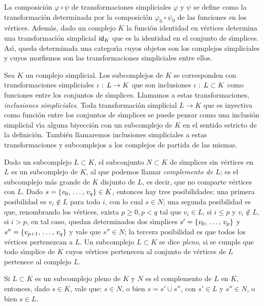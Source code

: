 La composici\'{o}n $\varphi\circ\psi$ de transformaciones simpliciales
$\varphi$ y $\psi$ se define como la transformaci\'{o}n determinada por la
composici\'{o}n $\varphi_{0}\circ\psi_{0}$ de las funciones en los
v\'{e}rtices. Adem\'{a}s, dado un complejo $K$ la funci\'{o}n identidad en
v\'{e}rtices determina una transformaci\'{o}n simplicial $\id[K]$ que es la
identidad en el conjunto de s\'{\i}mplices. As\'{\i}, queda determinada
una categor\'{\i}a cuyos objetos son los complejos simpliciales y cuyos
morfismos son las transformaciones simpliciales entre ellos.

Sea $K$ un complejo simplicial. Los subcomplejos de $K$ se corresponden con
transformaciones simpliciales $\inc:\,L\rightarrow K$ que son inclusiones
$\inc:\,L\subset K$ como funciones entre los conjuntos de s\'{\i}mplices.
Llamamos a estas transformaciones, \emph{inclusiones simpliciales}.
Toda transformaci\'{o}n simplicial $L\rightarrow K$ que es inyectiva como
funci\'{o}n entre los conjuntos de s\'{\i}mplices se puede pensar como una
inclusi\'{o}n simplicial v\'{\i}a alguna biyecci\'{o}n con un subcomplejo
de $K$ en el sentido estricto de la definici\'{o}n. Tambi\'{e}n llamaremos
inclusiones simpliciales a estas transformaciones y subcomplejos a los
complejos de partida de las mismas.

Dado un subcomplejo $L\subset K$, el subconjunto $N\subset K$ de
s\'{\i}mplices sin v\'{e}rtices en $L$ es un subcomplejo de $K$, al que
podemos llamar \emph{complemento de $L$}; es el subcomplejo m\'{a}s grande
de $K$ disjunto de $L$, es decir, que no comparte v\'{e}rtices con $L$.
Dado $s=\{\lista[0]{v}{q}\}\in K$, entonces hay tres posibilidades:
una primera posibilidad es $v_{i}\not\in L$ para todo $i$, con lo cual
$s\in N$; una segunda posibilidad es que, renombrando los v\'{e}rtices,
exista $p\geq 0,p<q$ tal que $v_{i}\in L$, si $i\leq p$ y $v_{i}\not\in L$,
si $i>p$, en tal caso, quedan determinados dos s\'{\i}mplices
$s'=\{\lista[0]{v}{p}\}$ y $s''=\{\lista[p+1]{v}{q}\}$ y vale que
$s''\in N$; la tercera posibilidad es que todos los v\'{e}rtices pertenezcan
a $L$. Un subcomplejo $L\subset K$ se dice \emph{pleno}, si se cumple que todo
s\'{\i}mplice de $K$ cuyos v\'{e}rtices pertenecen al conjunto de
v\'{e}rtices de $L$ pertenece al complejo $L$.

\begin{lemaSubcomplejoPleno}\label{thm:subcomplejopleno}
	Si $L\subset K$ es un subcomplejo pleno de $K$ y $N$ es
	el complemento de $L$ en $K$, entonces, dado $s\in K$, vale que:
	$s\in N$, o bien $s=s'\cup s''$, con $s'\in L$ y $s''\in N$, o bien
	$s\in L$.
\end{lemaSubcomplejoPleno}

